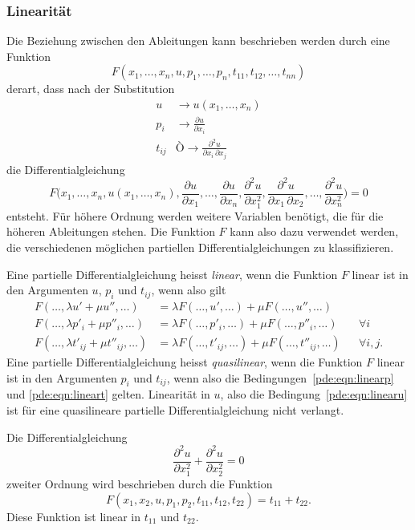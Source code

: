 \subsubsection{Linearität}
Die Beziehung zwischen den Ableitungen kann beschrieben werden durch
eine Funktion
\[
F(x_1,\dots,x_n,u,p_1,\dots,p_n,t_{11},t_{12},\dots,t_{nn})
\]
derart, dass nach der Substitution
\begin{align*}
u&\to u(x_1,\dots,x_n)
\\
p_i&\to \frac{\partial u}{\partial x_i}
\\
t_{ij} &Ò\to \frac{\partial^2 u}{\partial x_i\,\partial x_j}
\end{align*}
die Differentialgleichung
\[
F\biggl(
x_1,\dots,x_n,u(x_1,\dots,x_n),
\frac{\partial u}{\partial x_1},\dots,\frac{\partial u}{\partial x_n},
\frac{\partial^2u}{\partial x_1^2},
\frac{\partial^2u}{\partial x_1\,\partial x_2},\dots,
\frac{\partial^2u}{\partial x_n^2}
\biggr)
=0
\]
entsteht.
Für höhere Ordnung werden weitere Variablen benötigt, die für die
höheren Ableitungen stehen.
Die Funktion $F$ kann also dazu verwendet werden, die verschiedenen
möglichen partiellen Differentialgleichungen zu klassifizieren.

Eine partielle Differentialgleichung heisst {\em linear}, wenn die
Funktion $F$ linear ist in den Argumenten $u$, $p_i$ und $t_{ij}$,
wenn also gilt
\begin{align}
F(\dots,\lambda u' + \mu u'',\dots)
&=
\lambda F(\dots,u',\dots) + \mu F(\dots,u'',\dots)
\label{pde:eqn:linearu}
\\
F(\dots,\lambda p'_i+\mu p''_i,\dots)
&=
\lambda F(\dots,p'_i,\dots) + \mu F(\dots,p''_i,\dots)
&&\forall i
\label{pde:eqn:linearp}
\\
F(\dots,\lambda t'_{ij}+\mu t''_{ij},\dots)
&=
\lambda F(\dots,t'_{ij},\dots) + \mu F(\dots,t''_{ij},\dots)
&&\forall i,j.
\label{pde:eqn:lineart}
\end{align}
Eine partielle Differentialgleichung heisst {\em quasilinear}, 
wenn die Funktion $F$ linear ist in den Argumenten $p_i$ und $t_{ij}$,
wenn also die Bedingungen~\eqref{pde:eqn:linearp} und \eqref{pde:eqn:lineart}
gelten.
%
Linearität in $u$, also die Bedingung~\eqref{pde:eqn:linearu} ist
für eine quasilineare partielle Differentialgleichung nicht verlangt.

\begin{beispiel}
Die Differentialgleichung
\[
\frac{\partial^2 u}{\partial x_1^2}
+
\frac{\partial^2 u}{\partial x_2^2}
=
0
\]
zweiter Ordnung wird beschrieben durch die Funktion
\[
F(x_1,x_2,u,p_1,p_2,t_{11},t_{12},t_{22})
=
t_{11} + t_{22}.
\]
Diese Funktion ist linear in $t_{11}$ und $t_{22}$.
\end{beispiel}

